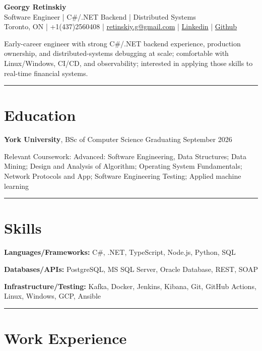 \documentclass[10pt,a4paper]{article}
\newcommand{\sectiondivider}{\vspace{0.35em}\hrule\vspace{0.45em}}
\begin{document}
\begin{center}
    {\LARGE \textbf{Georgy Retinskiy}}\\[0.25em]
    {\large Software Engineer | C\#/.NET Backend | Distributed Systems}\\[0.35em]
    Toronto, ON \;|\; +1(437)2560408 \;|\; \href{mailto:retinskiy.g@gmail.com}{retinskiy.g@gmail.com} \;|\;
    \href{https://www.linkedin.com/}{Linkedin} \;|\; \href{https://github.com/}{Github}
\end{center}

\vspace{0.35em}

Early-career engineer with strong C\#/.NET backend experience, production ownership, and distributed-systems debugging at scale;
comfortable with Linux/Windows, CI/CD, and observability; interested in applying those skills to real-time financial systems.

\sectiondivider
\section*{Education}
\textbf{York University}, BSc of Computer Science \hfill Graduating September 2026

Relevant Coursework: Advanced: Software Engineering, Data Structures; Data Mining; Design and Analysis of Algorithm;
Operating System Fundamentals; Network Protocols and App; Software Engineering Testing; Applied machine learning

\sectiondivider
\section*{Skills}
\textbf{Languages/Frameworks:} C\#, .NET, TypeScript, Node.js, Python, SQL

\textbf{Databases/APIs:} PostgreSQL, MS SQL Server, Oracle Database, REST, SOAP

\textbf{Infrastructure/Testing:} Kafka, Docker, Jenkins, Kibana, Git, GitHub Actions, Linux, Windows, GCP, Ansible

\sectiondivider
\section*{Work Experience}
\end{document}
